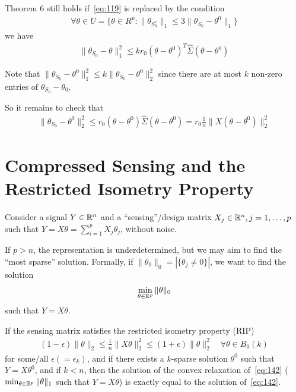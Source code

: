 \begin{corollary}
  Theorem 6 still holds if~\eqref{eq:119} is replaced by the condition
  \begin{align}
    \label{eq:139}
    \forall \theta \in U = \{ \theta \in R^{p}: \| \theta_{S_{0}^{c}}
    \|_{1} \leq 3 \| \theta_{S_{0}} - \theta^{0} \|_{1} \}
  \end{align} we have
  \begin{align}
    \label{eq:140}
    \| \theta_{S_{0}} - \theta \|_{1}^{2} \leq k r_{0} (\theta -
    \theta^{0})^{T} \hat \Sigma (\theta - \theta^{0})
  \end{align}

  Note that $\| \theta_{S_{0}} - \theta^{0} \|_{1}^{2} \leq k \|
  \theta_{S_{0}} - \theta^{0} \|_{2}^{2}$ since there are at most $k$
  non-zero entries of $\theta_{S_{0}} - \theta_{0}$.
\end{corollary}

So it remains to check that
\begin{align}
  \label{eq:141}
  \| \theta_{S_{0}} - \theta^{0} \|_{2}^{2} \leq r_{0} (\theta -
  \theta^{0}) \hat \Sigma (\theta - \theta^{0}) = r_{0} \frac{1}{n} \|
  X(\theta - \theta^{0}) \|_{2}^{2}
\end{align}

\section{Compressed Sensing and the Restricted Isometry Property}
\label{sec:compr-sens-restr}

Consider a signal $Y \in \mathbb{R}^{n}$ and a ``sensing''/design matrix
$X_{j} \in \mathbb{R}^{n}, j = 1, \dots, p$ such that $Y = X \theta =
\sum_{i=1}^{p} X_{j} \theta_{j}$, without noise.

If $p > n$, the representation is underdetermined, but we may aim to
find the ``most sparse'' solution.  Formally, if $\| \theta_{0} \|_{0}
= |\{ \theta_{j} \neq 0 \}|$, we want to find the solution
\begin{align}
  \label{eq:142}
  \min_{\theta \in \mathbb{R}^{p}} \| \theta \|_{0}
\end{align} such that $Y = X \theta$.

If the sensing matrix satisfies the restricted isometry property (RIP)
\begin{align}
  \label{eq:143}
  (1 - \epsilon) \| \theta \|_{2} \leq \frac{1}{n} \| X \theta
  \|_{2}^{2} \leq (1 + \epsilon) \| \theta \|_{2}^{2} \quad \forall \theta
  \in B_{0}(k)
\end{align} for some/all $\epsilon (=\epsilon_{k})$, and if there
exists a $k$-sparse solution $\theta^{0}$ such that $Y = X
\theta^{0}$, and if $k < n$, then the solution of the convex relaxation
of~\eqref{eq:142} ($\min_{\theta \in \mathbb{R}^{p}} \| \theta \|_{1}$ such
that $Y = X \theta$) is exactly equal to the solution
of~\eqref{eq:142}.

